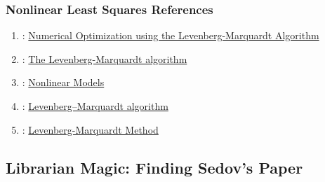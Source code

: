 \begin{frame}\frametitle{Nonlinear Least Squares References}
\begin{enumerate}
	\item {}: \href{https://mads.lanl.gov/presentations/Leif_LM_presentation_m.pdf}{Numerical Optimization using the
Levenberg-Marquardt Algorithm}\\[10pt]
	\item {}: \href{https://people.duke.edu/~hpgavin/ExperimentalSystems/lm.pdf}{The Levenberg-Marquardt algorithm}\\[10pt]
	\item {}: \href{https://www.foo.be/docs-free/Numerical_Recipe_In_C/c15-5.pdf}{Nonlinear Models}\\[10pt]
	\item {}: \href{https://en.wikipedia.org/wiki/Levenberg\%E2\%80\%93Marquardt_algorithm}{Levenberg–Marquardt algorithm}\\[10pt]
	\item {}: \href{https://mathworld.wolfram.com/Levenberg-MarquardtMethod.html}{Levenberg-Marquardt Method}
\end{enumerate}
\end{frame}

\subsection{Librarian Magic: Finding Sedov's Paper}




